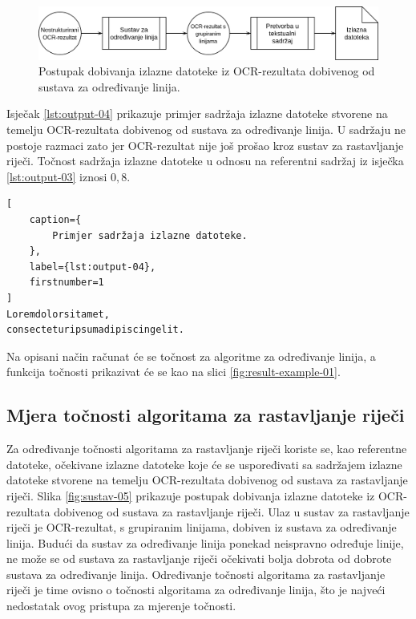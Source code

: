 \documentclass[times, utf8, zavrsni]{fer}
\begin{document}
\begin{figure}[htb]
    \centering
    \captionsetup{justification=centering,margin=2cm}
    \includegraphics[width=\textwidth]{images/sustav-04.png}
    \caption{
        Postupak dobivanja izlazne datoteke iz OCR-rezultata dobivenog od
        sustava za određivanje linija.
    }
    \label{fig:sustav-04}
\end{figure}

\pagebreak

Isječak \ref{lst:output-04} prikazuje primjer sadržaja izlazne datoteke stvorene
na temelju OCR-rezultata dobivenog od sustava za određivanje linija. U sadržaju
ne postoje razmaci zato jer OCR-rezultat nije još prošao kroz
sustav za rastavljanje riječi. Točnost sadržaja izlazne datoteke u odnosu na
referentni sadržaj iz isječka \ref{lst:output-03} iznosi $0{,}8$.

\begin{lstlisting}[
    caption={
        Primjer sadržaja izlazne datoteke.
    },
    label={lst:output-04},
    firstnumber=1
]
Loremdolorsitamet,
consecteturipsumadipiscingelit.
\end{lstlisting}

Na opisani način računat će se točnost za algoritme za određivanje linija, a
funkcija točnosti prikazivat će se kao na slici \ref{fig:result-example-01}.




\subsection{Mjera točnosti algoritama za rastavljanje riječi}
Za određivanje točnosti algoritama za rastavljanje riječi koriste se, kao
referentne datoteke, očekivane izlazne datoteke koje će se uspoređivati sa
sadržajem izlazne datoteke stvorene na temelju OCR-rezultata dobivenog od
sustava za rastavljanje riječi. Slika \ref{fig:sustav-05} prikazuje postupak
dobivanja izlazne datoteke iz OCR-rezultata dobivenog od sustava za
rastavljanje riječi. Ulaz u sustav za rastavljanje riječi je OCR-rezultat, s
grupiranim linijama, dobiven iz sustava za određivanje linija. Budući da sustav
za određivanje linija ponekad neispravno određuje linije, ne može se od sustava
za rastavljanje riječi očekivati bolja dobrota od dobrote sustava za
određivanje linija. Određivanje točnosti algoritama za rastavljanje riječi je
time ovisno o točnosti algoritama za određivanje linija, što je najveći
nedostatak ovog pristupa za mjerenje točnosti.
\end{document}
